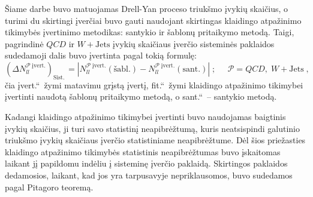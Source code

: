 \documentclass[a4paper, 12pt, oneside]{article}
\newcommand{\WJets}{W\! +\!\mathrm{Jets}}
\newcommand{\ltq}[1]{{\quotedblbase{}#1\textquotedblleft{}}}
\newcommand{\QCD}{QC\! D}
\newlength\q
\begin{document}
Šiame darbe buvo matuojamas Drell-Yan proceso triukšmo įvykių skaičius, o turimi du skirtingi įverčiai buvo gauti naudojant
skirtingas klaidingo atpažinimo tikimybės įvertinimo metodikas: santykio ir šablonų pritaikymo metodą.
Taigi, pagrindinė $\QCD$ ir $\WJets$ įvykių skaičiaus įverčio sisteminės paklaidos sudedamoji dalis buvo įvertinta pagal
tokią formulę:
\begin{equation}
	(\Delta N_{ll}^{\mathcal{P} \; \mathrm{įvert.}})_{\mathrm{Sist.\,}} =
	\left| N_{ll}^{\mathcal{P} \; \mathrm{įvert.}}(\mathrm{šabl.}) -
	N_{ll}^{\mathcal{P} \; \mathrm{įvert.}}(\mathrm{sant.}) \right| \;  ;
	\;\;\;\;\; \mathcal{P} = \QCD, \; \WJets \; ,
	\label{eq:systUncFR}
\end{equation}
čia \ltq{įvert.}\ žymi matavimu grįstą įvertį, \ltq{fit.}\ žymi klaidingo atpažinimo tikimybei įvertinti naudotą šablonų
pritaikymo metodą, o \ltq{sant.}\ -- santykio metodą.

Kadangi klaidingo atpažinimo tikimybei įvertinti buvo naudojamas baigtinis įvykių skaičius, ji turi savo statistinį neapibrėžtumą,
kuris neatsispindi galutinio triukšmo įvykių skaičiaus įverčio statistiniame neapibrėžtume.
Dėl šios priežasties klaidingo atpažinimo tikimybės statistinis neapibrėžtumas buvo įskaitomas laikant jį papildomu indėliu į
sisteminę įverčio paklaidą.
Skirtingos paklaidos dedamosios, laikant, kad jos yra tarpusavyje nepriklausomos, buvo sudedamos pagal Pitagoro teoremą.
\end{document}
